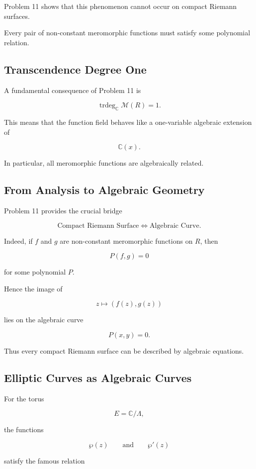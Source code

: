 \documentclass[12pt,a4paper]{article}
\theoremstyle{notespace}
\begin{document}
Problem 11 shows that this phenomenon cannot occur on compact Riemann surfaces.

Every pair of non-constant meromorphic functions must satisfy some polynomial relation.

\subsection{Transcendence Degree One}

A fundamental consequence of Problem 11 is

\[
\operatorname{trdeg}_{\mathbb C}
\mathcal M(R)
=
1.
\]

This means that the function field behaves like a one-variable algebraic extension of

\[
\mathbb C(x).
\]

In particular, all meromorphic functions are algebraically related.

\subsection{From Analysis to Algebraic Geometry}

Problem 11 provides the crucial bridge

\[
\text{Compact Riemann Surface}
\Longleftrightarrow
\text{Algebraic Curve}.
\]

Indeed, if \(f\) and \(g\) are non-constant meromorphic functions on \(R\), then

\[
P(f,g)=0
\]

for some polynomial \(P\).

Hence the image of

\[
z\mapsto(f(z),g(z))
\]

lies on the algebraic curve

\[
P(x,y)=0.
\]

Thus every compact Riemann surface can be described by algebraic equations.

\subsection{Elliptic Curves as Algebraic Curves}

For the torus

\[
E=\mathbb C/\Lambda,
\]

the functions

\[
\wp(z)
\qquad\text{and}\qquad
\wp'(z)
\]

satisfy the famous relation
\end{document}
